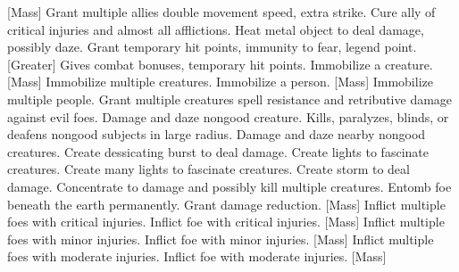 [Mass]
    {Grant multiple allies double movement speed, extra strike.}
    {Cure ally of critical injuries and almost all afflictions.}
    {Heat metal object to deal damage, possibly daze.}
    {Grant temporary hit points, immunity to fear, legend point.}
[Greater]
    {Gives combat bonuses, temporary hit points.}
    {Immobilize a creature.}
[Mass]
    {Immobilize multiple creatures.}
    {Immobilize a person.}
[Mass]
    {Immobilize multiple people.}
    {Grant multiple creatures spell resistance and retributive damage against evil foes.}
    {Damage and daze nongood creature.}
    {Kills, paralyzes, blinds, or deafens nongood subjects in large radius.}
    {Damage and daze nearby nongood creatures.}
    {Create dessicating burst to deal damage.}
    {Create lights to fascinate creatures.}
    {Create many lights to fascinate creatures.}
    {Create storm to deal damage.}
    {Concentrate to damage and possibly kill multiple creatures.}
    {Entomb foe beneath the earth permanently.}
    {Grant damage reduction.}
[Mass]
    {Inflict multiple foes with critical injuries.}
    {Inflict foe with critical injuries.}
[Mass]
    {Inflict multiple foes with minor injuries.}
    {Inflict foe with minor injuries.}
[Mass]
    {Inflict multiple foes with moderate injuries.}
    {Inflict foe with moderate injuries.}
[Mass]
